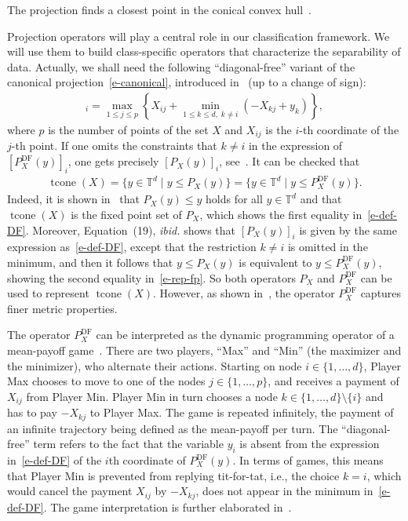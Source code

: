 \documentclass{article}
\newcommand{\tcone}{\operatorname{tcone}}
\renewcommand{\leq}{\leqslant}
\newcommand{\trop}{\mathbb{T}}
\begin{document}
The projection finds a closest point in the conical convex hull~\cite{cohen2004,AGNS10}.

Projection operators will play a central role in our classification framework. We will use them to build class-specific operators that characterize the separability of data.
Actually, we shall need the following ``diagonal-free'' variant of the canonical projection~\eqref{e-canonical},
introduced in~\cite[Equation~(9)]{akiangaubertqisaadi} (up to a change of sign):
\begin{align}
  [P_X^{\text{DF}}(y)]_i = \max_{1 \leq j \leq p} \left\{X_{ij} + \min_{1\leq k\leq d,\; k \neq i} (-X_{kj} + y_k)\right\},
  \label{e-def-DF}
\end{align}
where $p$ is the number of points of the set $X$ and $X_{ij}$ is the $i$-th coordinate of the $j$-th point.
If one omits the constraints that $k\neq i$ in the expression of $[P_X^{\text{DF}}(y)]_i$, one gets
precisely $[P_X(y)]_i$, see~\cite[Theorem~5]{cohen2004}. It can be checked that 
\begin{align}
  \label{e-rep-fp}
  \tcone(X)= \{y\in \trop^d\mid y\leq P_X(y)\} = \{y\in \trop^d\mid y\leq P_X^{\text{DF}}(y)\}.
\end{align}
Indeed, it is shown in~\cite[Section 3.1]{cohen2004} that $P_X(y)\leq y$ holds for all $y\in \trop^d$ and that $\tcone(X)$ is the fixed point set of $P_X$,
which shows the first equality in~\eqref{e-def-DF}. Moreover, Equation~(19), {\em ibid.} shows that $[P_X(y)]_i$ is given by the same expression as~\eqref{e-def-DF}, except that the restriction $k\neq i$ is omitted in the minimum, and then it follows that $y\leq P_X(y)$ is equivalent to $y\leq P_X^{\text{DF}}(y)$,
showing the second equality in~\eqref{e-rep-fp}.
So both operators $P_X$ and $P_X^{\text{DF}}$ can be used to represent $\tcone(X)$. However, as shown in~\cite[Theorem~6]{akiangaubertqisaadi}, the operator $P_X^{\text{DF}}$ captures finer metric properties.

The operator $P_X^{\text{DF}}$ can be interpreted as the dynamic programming operator of a mean-payoff game~\cite{AGGut10}.
There are two players, ``Max'' and ``Min'' (the maximizer
and the minimizer), who alternate their actions. Starting on node
$i\in \{1,\dots,d\}$, Player Max chooses to move to one of the nodes $j\in \{1,\dots,p\}$, and receives a payment of $X_{ij}$
from Player Min. Player Min in turn chooses a node $k\in \{1,\dots,d\}\setminus\{i\}$ and has to pay $-X_{kj}$ to Player Max. The game is repeated infinitely,
the payment of an infinite trajectory being defined as the mean-payoff per turn.
The ``diagonal-free'' term refers to the fact that the variable $y_i$
is absent from the expression in~\eqref{e-def-DF}
of the $i$th coordinate of  $P_X^{\text{DF}}(y)$. In terms
  of games, this means that Player Min is prevented from replying tit-for-tat,
  i.e., the choice $k=i$, which would cancel the payment $X_{ij}$
  by $-X_{kj}$, does not appear in the minimum in~\eqref{e-def-DF}.
  The game interpretation is further elaborated in~\cite{akiangaubertqisaadi}.
\end{document}
